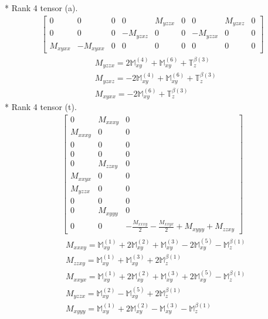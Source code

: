 \documentclass[fleqn,8pt,landscape]{jsarticle}
\begin{document}
* Rank 4 tensor (a).
\begin{align*}
\begin{bmatrix} 0 & 0 & 0 & 0 & M_{yzzx} & 0 & 0 & M_{yzxz} & 0 \\ 0 & 0 & 0 & - M_{yzxz} & 0 & 0 & - M_{yzzx} & 0 & 0 \\ M_{xyxx} & - M_{xyxx} & 0 & 0 & 0 & 0 & 0 & 0 & 0 \end{bmatrix}
\end{align*}
\begin{align*}
& M_{yzzx} = 2 \mathbb{M}_{xy}^{(4)} + \mathbb{M}_{xy}^{(6)} + \mathbb{T}_{z}^{\beta(3)} \\
& M_{yzxz} = - 2 \mathbb{M}_{xy}^{(4)} + \mathbb{M}_{xy}^{(6)} + \mathbb{T}_{z}^{\beta(3)} \\
& M_{xyxx} = - 2 \mathbb{M}_{xy}^{(6)} + \mathbb{T}_{z}^{\beta(3)}
\end{align*}
* Rank 4 tensor (t).
\begin{align*}
\begin{bmatrix} 0 & M_{xxxy} & 0 \\ M_{xxxy} & 0 & 0 \\ 0 & 0 & 0 \\ 0 & 0 & 0 \\ 0 & M_{zzxy} & 0 \\ M_{xxyx} & 0 & 0 \\ M_{yzzx} & 0 & 0 \\ 0 & 0 & 0 \\ 0 & M_{xyyy} & 0 \\ 0 & 0 & - \frac{M_{xxxy}}{2} - \frac{M_{xxyx}}{2} + M_{xyyy} + M_{zzxy} \end{bmatrix}
\end{align*}
\begin{align*}
& M_{xxxy} = \mathbb{M}_{xy}^{(1)} + 2 \mathbb{M}_{xy}^{(2)} + \mathbb{M}_{xy}^{(3)} - 2 \mathbb{M}_{xy}^{(5)} - \mathbb{M}_{z}^{\beta(1)} \\
& M_{zzxy} = \mathbb{M}_{xy}^{(1)} + \mathbb{M}_{xy}^{(3)} + 2 \mathbb{M}_{z}^{\beta(1)} \\
& M_{xxyx} = \mathbb{M}_{xy}^{(1)} + 2 \mathbb{M}_{xy}^{(2)} + \mathbb{M}_{xy}^{(3)} + 2 \mathbb{M}_{xy}^{(5)} - \mathbb{M}_{z}^{\beta(1)} \\
& M_{yzzx} = \mathbb{M}_{xy}^{(2)} - \mathbb{M}_{xy}^{(5)} + 2 \mathbb{M}_{z}^{\beta(1)} \\
& M_{xyyy} = \mathbb{M}_{xy}^{(1)} + 2 \mathbb{M}_{xy}^{(2)} - \mathbb{M}_{xy}^{(3)} - \mathbb{M}_{z}^{\beta(1)}
\end{align*}
\end{document}
